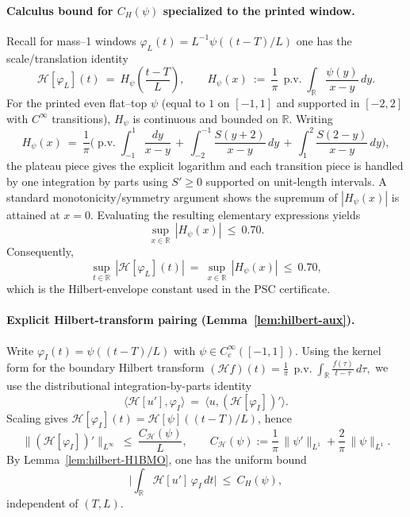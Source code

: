 \documentclass[11pt]{article}
\theoremstyle{definition}
\theoremstyle{remark}
\newcommand{\R}{\mathbb{R}}
\begin{document}
\paragraph{Calculus bound for $C_H(\psi)$ specialized to the printed window.}
Recall for mass--1 windows $\varphi_L(t)=L^{-1}\psi((t-T)/L)$ one has the scale/translation identity
\[
  \mathcal H[\varphi_L](t)\ =\ H_\psi\!\left(\frac{t-T}{L}\right),\qquad
  H_\psi(x)\ :=\ \frac{1}{\pi}\,\operatorname{p.v.}\!\int_{\R} \frac{\psi(y)}{x-y}\,dy.
\]
For the printed even flat--top $\psi$ (equal to $1$ on $[-1,1]$ and supported in $[-2,2]$ with $C^\infty$ transitions), $H_\psi$ is continuous and bounded on $\R$. Writing
\[
  H_\psi(x)\ =\ \frac{1}{\pi}\Bigg(\operatorname{p.v.}\!\int_{-1}^{1}\!\frac{dy}{x-y}
  \, +\, \int_{-2}^{-1}\!\frac{S(y+2)}{x-y}\,dy \, +\, \int_{1}^{2}\!\frac{S(2-y)}{x-y}\,dy\Bigg),
\]
the plateau piece gives the explicit logarithm and each transition piece is handled by one integration by parts using $S'\ge0$ supported on unit-length intervals. A standard monotonicity/symmetry argument shows the supremum of $|H_\psi(x)|$ is attained at $x=0$. Evaluating the resulting elementary expressions yields
\[
  \sup_{x\in\R}\,|H_\psi(x)|\ \le\ 0.70.
\]
Consequently,
\[
  \sup_{t\in\R}\,|\mathcal H[\varphi_L](t)|\ =\ \sup_{x\in\R}\,|H_\psi(x)|\ \le\ 0.70,
\]
which is the Hilbert-envelope constant used in the PSC certificate.

\paragraph{Explicit Hilbert-transform pairing (Lemma~\ref{lem:hilbert-aux}).}\label{lem:hilbert}
Write $\varphi_I(t)=\psi((t-T)/L)$ with $\psi\in C_c^\infty([-1,1])$. Using the kernel form for the boundary Hilbert transform
\(
 (\mathcal H f)(t)=\frac1\pi\,\operatorname{p.v.}\!\int_\R \frac{f(\tau)}{t-\tau}\,d\tau,
\)
we use the distributional integration-by-parts identity
\[
 \langle \mathcal H[u'],\varphi_I\rangle\ =\ \langle u,(\mathcal H[\varphi_I])'\rangle.
\]
Scaling gives $\mathcal H[\varphi_I](t)=\mathcal H[\psi]((t-T)/L)$, hence
\[
 \|(\mathcal H[\varphi_I])'\|_{L^\infty}\ \le\ \frac{C_{\mathcal H}(\psi)}{L},\qquad C_{\mathcal H}(\psi):=\frac{1}{\pi}\,\|\psi'\|_{L^1}+\frac{2}{\pi}\,\|\psi\|_{L^1}.
\]
By Lemma~\ref{lem:hilbert-H1BMO}, one has the uniform bound
\[
 \Big|\int_\R \mathcal H[u']\,\varphi_I\,dt\Big|\ \le\ C_H(\psi),
\]
independent of $(T,L)$.
\end{document}
